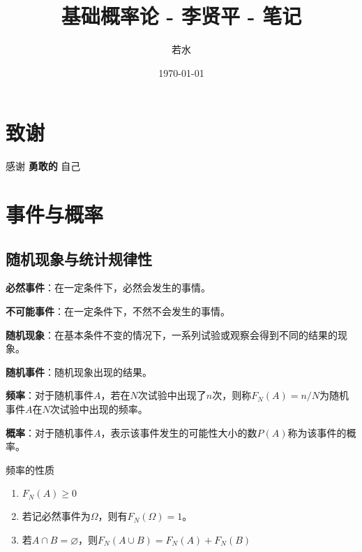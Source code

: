 \documentclass[lang = cn, scheme = chinese, thmcnt = section]{elegantbook}
\title{基础概率论 - 李贤平 - 笔记}                %
\author{若水}                        %
\date{\today}                       %
\begin{document}
	
\maketitle       %

\frontmatter     %

\chapter*{致谢}


\vspace*{\fill}
	\begin{center}
		
		\large{感谢 \textbf{ 勇敢的 } 自己}
		
	\end{center}
\vspace*{\fill}

\tableofcontents %

\mainmatter      %

\chapter{事件与概率}

\section{随机现象与统计规律性}

\textbf{必然事件}：在一定条件下，必然会发生的事情。

\textbf{不可能事件}：在一定条件下，不然不会发生的事情。

\textbf{随机现象}：在基本条件不变的情况下，一系列试验或观察会得到不同的结果的现象。

\textbf{随机事件}：随机现象出现的结果。

\textbf{频率}：对于随机事件$A$，若在$N$次试验中出现了$n$次，则称$F_N(A)=n/N$为随机事件$A$在$N$次试验中出现的频率。

\textbf{概率}：对于随机事件$A$，表示该事件发生的可能性大小的数$P(A)$称为该事件的概率。

\begin{proposition}{频率的性质}
	\begin{enumerate}
		\item $F_N(A)\ge 0$
		\item 若记必然事件为$\Omega$，则有$F_N(\Omega)=1$。
		\item 若$A\cap B=\varnothing$，则$F_N(A\cup B)=F_N(A)+F_N(B)$
	\end{enumerate}
\end{proposition}
\end{document}
